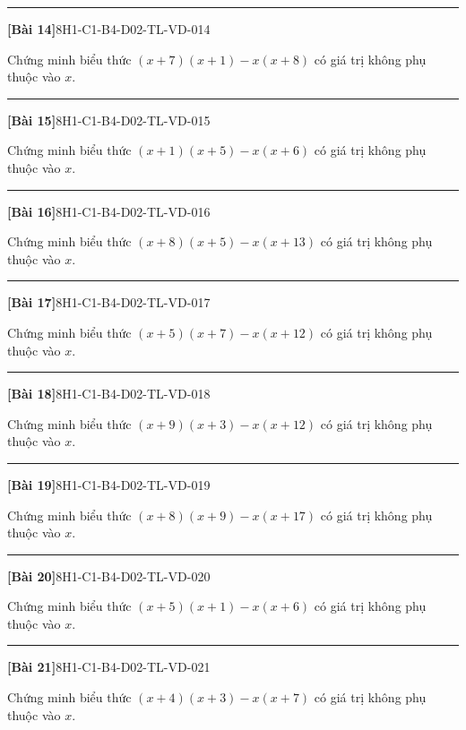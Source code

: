 \documentclass[12pt,a4paper]{article}
\newif\ifloigiai
\newenvironment{cauhoi}[2]{%
  \par\medskip\noindent\rule{\textwidth}{0.4pt}\par\nopagebreak
  \noindent\textbf{[#1]}\hfill{\scriptsize\ttfamily #2}\par\nopagebreak\smallskip}{\par}
\newcommand{\loigiai}[1]{\ifloigiai\par\smallskip\noindent\textit{Lời giải.} #1\par\fi}
\begin{document}
\begin{cauhoi}{Bài 14}{8H1-C1-B4-D02-TL-VD-014}
Chứng minh biểu thức $(x+7)(x+1)-x(x+8)$ có giá trị không phụ thuộc vào $x$.
\loigiai{$(x+7)(x+1)-x(x+8)=x^{2}+7x+x+7-x^{2}-8x=7$. Kết quả là hằng số nên biểu thức không phụ thuộc vào $x$.}
\end{cauhoi}
\begin{cauhoi}{Bài 15}{8H1-C1-B4-D02-TL-VD-015}
Chứng minh biểu thức $(x+1)(x+5)-x(x+6)$ có giá trị không phụ thuộc vào $x$.
\loigiai{$(x+1)(x+5)-x(x+6)=x^{2}+x+5x+5-x^{2}-6x=5$. Kết quả là hằng số nên biểu thức không phụ thuộc vào $x$.}
\end{cauhoi}
\begin{cauhoi}{Bài 16}{8H1-C1-B4-D02-TL-VD-016}
Chứng minh biểu thức $(x+8)(x+5)-x(x+13)$ có giá trị không phụ thuộc vào $x$.
\loigiai{$(x+8)(x+5)-x(x+13)=x^{2}+8x+5x+40-x^{2}-13x=40$. Kết quả là hằng số nên biểu thức không phụ thuộc vào $x$.}
\end{cauhoi}
\begin{cauhoi}{Bài 17}{8H1-C1-B4-D02-TL-VD-017}
Chứng minh biểu thức $(x+5)(x+7)-x(x+12)$ có giá trị không phụ thuộc vào $x$.
\loigiai{$(x+5)(x+7)-x(x+12)=x^{2}+5x+7x+35-x^{2}-12x=35$. Kết quả là hằng số nên biểu thức không phụ thuộc vào $x$.}
\end{cauhoi}
\begin{cauhoi}{Bài 18}{8H1-C1-B4-D02-TL-VD-018}
Chứng minh biểu thức $(x+9)(x+3)-x(x+12)$ có giá trị không phụ thuộc vào $x$.
\loigiai{$(x+9)(x+3)-x(x+12)=x^{2}+9x+3x+27-x^{2}-12x=27$. Kết quả là hằng số nên biểu thức không phụ thuộc vào $x$.}
\end{cauhoi}
\begin{cauhoi}{Bài 19}{8H1-C1-B4-D02-TL-VD-019}
Chứng minh biểu thức $(x+8)(x+9)-x(x+17)$ có giá trị không phụ thuộc vào $x$.
\loigiai{$(x+8)(x+9)-x(x+17)=x^{2}+8x+9x+72-x^{2}-17x=72$. Kết quả là hằng số nên biểu thức không phụ thuộc vào $x$.}
\end{cauhoi}
\begin{cauhoi}{Bài 20}{8H1-C1-B4-D02-TL-VD-020}
Chứng minh biểu thức $(x+5)(x+1)-x(x+6)$ có giá trị không phụ thuộc vào $x$.
\loigiai{$(x+5)(x+1)-x(x+6)=x^{2}+5x+x+5-x^{2}-6x=5$. Kết quả là hằng số nên biểu thức không phụ thuộc vào $x$.}
\end{cauhoi}
\begin{cauhoi}{Bài 21}{8H1-C1-B4-D02-TL-VD-021}
Chứng minh biểu thức $(x+4)(x+3)-x(x+7)$ có giá trị không phụ thuộc vào $x$.
\loigiai{$(x+4)(x+3)-x(x+7)=x^{2}+4x+3x+12-x^{2}-7x=12$. Kết quả là hằng số nên biểu thức không phụ thuộc vào $x$.}
\end{cauhoi}
\end{document}
